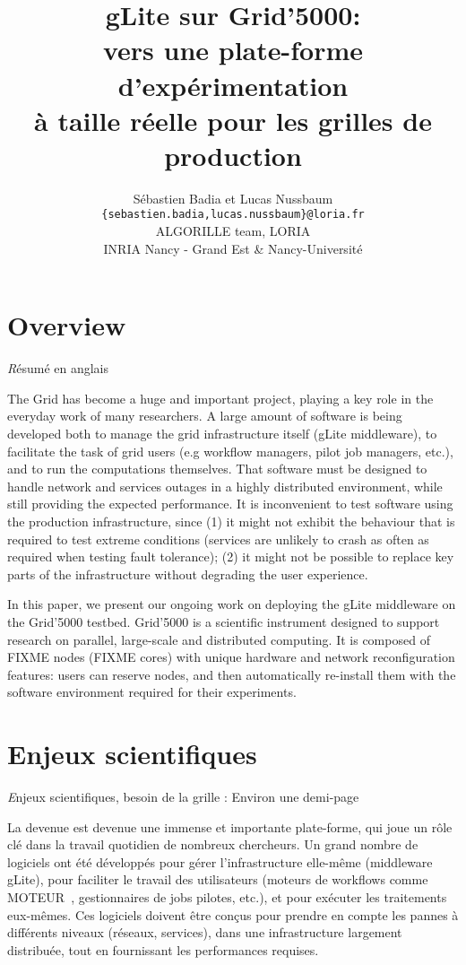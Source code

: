 \documentclass[a4paper,11pt]{article}
\title{gLite sur Grid'5000:\\ vers une plate-forme d'expérimentation\\ à taille réelle pour les grilles de production}
\date{}
\author{Sébastien Badia et Lucas Nussbaum\\
\texttt{\normalsize \{sebastien.badia,lucas.nussbaum\}@loria.fr}\\[1em]
\normalsize ALGORILLE team, LORIA\\
INRIA Nancy - Grand Est \& Nancy-Université}
\newcommand{\todo}[1]{{\color{red}\textsl #1}}
\begin{document}
\maketitle

\section{Overview}
\todo{Résumé en anglais}

The Grid has become a huge and important project, playing a key role in the
everyday work of many researchers. A large amount of software is being developed
both to manage the grid infrastructure itself (gLite middleware\cite{glite}),
to facilitate the task of grid users (e.g workflow managers\cite{moteur},
pilot job managers, etc.), and to run the computations themselves.
That software must be designed to handle network and services outages in a
highly distributed environment, while still providing the expected performance.
It is inconvenient to test software using the production infrastructure, since
(1) it might not exhibit the behaviour that is required to test extreme
conditions (services are unlikely to crash as often as required when testing
fault tolerance); (2) it might not be possible to replace key parts of the
infrastructure without degrading the user experience.

In this paper, we present our ongoing work on deploying the gLite middleware on
the Grid'5000 testbed. Grid'5000 is a scientific instrument designed to support
research on parallel, large-scale and distributed computing. It is composed of
FIXME nodes (FIXME cores) with unique hardware and network reconfiguration
features: users can reserve nodes, and then automatically re-install them with
the software environment required for their experiments.


\section{Enjeux scientifiques}
\todo{Enjeux scientifiques, besoin de la grille : Environ une demi-page}

La devenue est devenue une immense et importante plate-forme, qui joue un rôle
clé dans la travail quotidien de nombreux chercheurs. Un grand nombre de
logiciels ont été développés pour gérer l'infrastructure elle-même (middleware
gLite\cite{glite}), pour faciliter le travail des utilisateurs (moteurs de
workflows comme MOTEUR~\cite{moteur}, gestionnaires de jobs pilotes, etc.), et
pour exécuter les traitements eux-mêmes.
Ces logiciels doivent être conçus pour prendre en compte les pannes à
différents niveaux (réseaux, services), dans une infrastructure largement
distribuée, tout en fournissant les performances requises.
\end{document}

